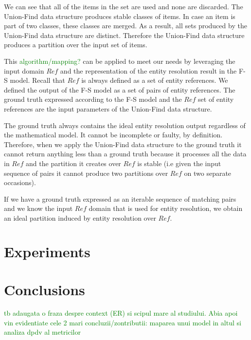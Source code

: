 \documentclass[journal]{IEEEtran}
\begin{document}
    We can see that all of the items in the set are used and none are discarded.
    The Union-Find data structure produces stable classes of items.
    In case an item is part of two classes, these classes are merged.
    As a result, all sets produced by the Union-Find data structure are
    distinct.
    Therefore the Union-Find data structure produces a partition over the input
    set of items.

    This 
    \textcolor{green}{algorithm/mapping?} 
    can be applied to meet our needs by leveraging the input domain $Ref$
    and the representation of the entity resolution result in the F-S model.
    Recall that $Ref$ is always defined as a set of entity references.
    We defined the output of the F-S model as a set of pairs of entity
    references.
    The ground truth expressed according to the F-S model and the $Ref$ set of
    entity references are the input parameters of the Union-Find data structure.

    The ground truth always contains the ideal entity resolution output
    regardless of the mathematical model.
    It cannot be incomplete or faulty, by definition.
    Therefore, when we apply the Union-Find data structure to the ground truth
    it cannot return anything less than a ground truth because it processes all
    the data in $Ref$ and the partition it creates over $Ref$ is stable (i.e
    given the input sequence of pairs it cannot produce two partitions over $Ref$
    on two separate occasions).

    If we have a ground truth expressed as an iterable sequence of matching
    pairs and we know the input $Ref$ domain that is used for entity resolution,
    we obtain an ideal partition induced by entity resolution over $Ref$.
    
    \section{Experiments}\label{sec:experiments}
    

    \section[conclusion]{Conclusions}\label{sec:conclusions}

    \textcolor{green}{tb adaugata o fraza despre context (ER) si scipul mare al studiului. Abia apoi vin evidentiate cele 2 mari concluzii/zontributii: maparea unui model in altul si analiza dpdv al metricilor}
\end{document}
